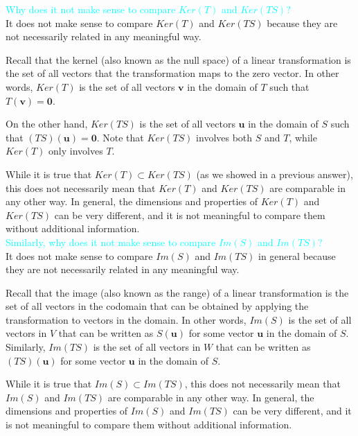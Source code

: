\documentclass[fontsize=12pt]{scrartcl}
\begin{document}
\vspace{4.5 in}

\noindent
\textcolor{cyan}{Why does it not make sense to compare $Ker(T)$ and $Ker(TS)$?}\\
\noindent
It does not make sense to compare $Ker(T)$ and $Ker(TS)$ because they are not necessarily related in any meaningful way.

\noindent
Recall that the kernel (also known as the null space) of a linear transformation is the set of all vectors that the transformation maps to the zero vector. In other words, $Ker(T)$ is the set of all vectors $\mathbf{v}$ in the domain of $T$ such that $T(\mathbf{v}) = \mathbf{0}$.

\noindent
On the other hand, $Ker(TS)$ is the set of all vectors $\mathbf{u}$ in the domain of $S$ such that $(TS)(\mathbf{u}) = \mathbf{0}$. Note that $Ker(TS)$ involves both $S$ and $T$, while $Ker(T)$ only involves $T$.

\noindent
While it is true that $Ker(T) \subset Ker(TS)$ (as we showed in a previous answer), this does not necessarily mean that $Ker(T)$ and $Ker(TS)$ are comparable in any other way. In general, the dimensions and properties of $Ker(T)$ and $Ker(TS)$ can be very different, and it is not meaningful to compare them without additional information.
\\

\noindent
\textcolor{cyan}{Similarly, why does it not make sense to compare $Im(S)$ and $Im(TS)$?}\\
\noindent
It does not make sense to compare $Im(S)$ and $Im(TS)$ in general because they are not necessarily related in any meaningful way.

\noindent
Recall that the image (also known as the range) of a linear transformation is the set of all vectors in the codomain that can be obtained by applying the transformation to vectors in the domain. In other words, $Im(S)$ is the set of all vectors in $V$ that can be written as $S(\mathbf{u})$ for some vector $\mathbf{u}$ in the domain of $S$. Similarly, $Im(TS)$ is the set of all vectors in $W$ that can be written as $(TS)(\mathbf{u})$ for some vector $\mathbf{u}$ in the domain of $S$.

\noindent
While it is true that $Im(S) \subset Im(TS)$, this does not necessarily mean that $Im(S)$ and $Im(TS)$ are comparable in any other way. In general, the dimensions and properties of $Im(S)$ and $Im(TS)$ can be very different, and it is not meaningful to compare them without additional information.
\end{document}
